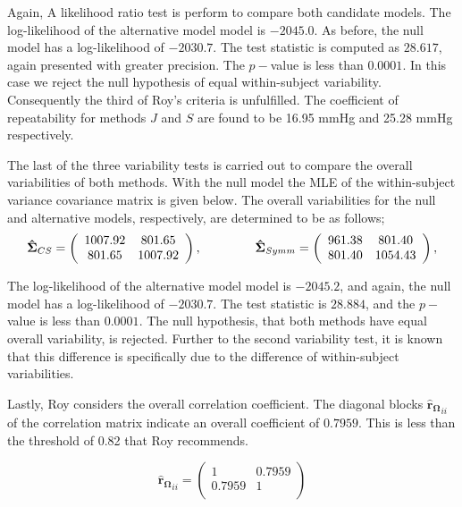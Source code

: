 \documentclass[12pt, a4paper]{report}
\theoremstyle{plain}
\theoremstyle{definition}
\theoremstyle{remark}
\begin{document}
Again, A likelihood ratio test is perform to compare both candidate models. The log-likelihood of the alternative model model is $-2045.0$. As before, the null model has a log-likelihood of $-2030.7$. The test statistic is computed as $28.617$, again presented with greater precision. The $p-$value is less than $0.0001$. In this case we reject the null hypothesis of equal within-subject variability. Consequently the third of Roy's criteria is unfulfilled.
The coefficient of repeatability for methods $J$ and $S$ are found to be 16.95 mmHg and 25.28 mmHg respectively.

The last of the three variability tests is carried out to compare the overall variabilities of both methods.
With the null model the MLE of the within-subject variance covariance matrix is given below. The overall variabilities for the null and alternative models, respectively, are determined to be as follows;
\[
\boldsymbol{\hat{\Sigma}}_{CS} = \left( \begin{array}{cc}
    1007.92  & 801.65  \\
    801.65  & 1007.92  \\
    \end{array}\right),
    \hspace{1.5cm}
\boldsymbol{\hat{\Sigma}}_{Symm} = \left( \begin{array}{cc}
    961.38 & 801.40  \\
    801.40 & 1054.43  \\
    \end{array}\right),
\]

The log-likelihood of the alternative model model is $-2045.2$, and again, the null model has a log-likelihood of $-2030.7$. The test statistic is $28.884$, and the $p-$value is less than $0.0001$. The null hypothesis, that both methods have equal overall variability, is rejected. Further to the second variability test, it is known that this difference is specifically due to the difference of within-subject variabilities.

Lastly, Roy considers the overall correlation coefficient. The diagonal blocks $\boldsymbol{\hat{r}_{\Omega}}_{ii}$ of the correlation matrix indicate an overall coefficient of $0.7959$. This is less than the threshold of 0.82 that Roy recommends.

\[
\boldsymbol{\hat{r}_{\Omega}}_{ii} = \left( \begin{array}{cc}
    1  & 0.7959  \\
    0.7959  & 1  \\
    \end{array}\right)
\]
\end{document}
